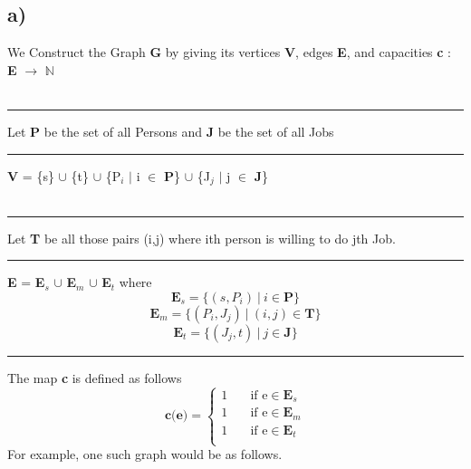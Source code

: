 \documentclass{report}
\begin{document}
 \subsection*{a)}
 We Construct the Graph \textbf{G} by giving its  vertices \textbf{V}, edges \textbf{E}, and capacities \textbf{c} : \textbf{E} $\rightarrow$ $\mathbb{N}$\\
 \vspace*{1.2em}\\
 \rule[0.5cm]{2cm}{0pt} Let \textbf{P} be the set of all Persons and \textbf{J} be the set of all Jobs\\
 \rule[0.5mm]{2cm}{0pt} \textbf{V} = \{s\} $\cup$ \{t\} $\cup$ \{P$_i$ $|$ i $\in$ \textbf{P}\} $\cup$ \{J$_j$ $|$ j $\in$ \textbf{J}\} \\
 \vspace*{1.2em}\\
 \rule[0.5mm]{2cm}{0pt} Let \textbf{T} be all those pairs (i,j) where ith person is willing to do jth Job.\\
 \rule[0.5mm]{2cm}{0pt} \textbf{E} = \textbf{E$_{s}$} $\cup$ \textbf{E$_{m}$} $\cup$  \textbf{E$_{t}$} where\\
 \begin{equation*}
     \mathbf{E}_s = \{(s,P_i)\  |\  i \in \mathbf{P}\} 
 \end{equation*}
 \begin{equation*}
     \mathbf{E}_m = \{(P_i,J_j)\  | \ (i,j) \in \mathbf{T} \}
 \end{equation*}
 \begin{equation*}
     \mathbf{E}_t = \{(J_j,t)\ |\  j \in \mathbf{J}\}
 \end{equation*}
  \rule[0.5mm]{2cm}{0pt} The map \textbf{c} is defined as follows \\
   \[   
    \textbf{c(e)} = 
         \begin{cases}
           1 &\quad\text{if e} \in \mathbf{E}_s\\
           1 &\quad\text{if e} \in \mathbf{E}_m\\
           1 &\quad\text{if e} \in \mathbf{E}_t\\
         \end{cases}
    \]
 \newpage
 For example, one such graph would be as follows.\\
\end{document}
